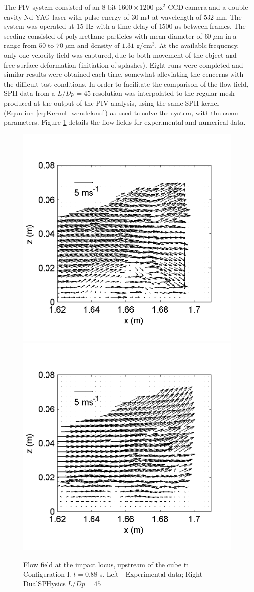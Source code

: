 The \ac{PIV} system consisted of an 8-bit $1600\times1200$ px$^2$ CCD camera and a double-cavity Nd-YAG laser with pulse energy of $30$ mJ at wavelength of $532$ mn. The system was operated at $15$ Hz with a time delay of $1500\; \mu$s between frames. The seeding consisted of polyurethane particles with mean diameter of $60\; \mu$m in a range from $50$ to $70\; \mu$m and density of $1.31$ g/cm$^3$. At the available frequency, only one velocity field was captured, due to both movement of the object and free-surface deformation (initiation of splashes). Eight runs were completed and similar results were obtained each time, somewhat alleviating the concerns with the difficult test conditions. In order to facilitate the comparison of the flow field, \ac{SPH} data from a $L/Dp=45$ resolution was interpolated to the regular mesh produced at the output of the \ac{PIV} analysis, using the same \ac{SPH} kernel (Equation \eqref{eq:Kernel_wendeland}) as used to solve the system, with the same parameters. Figure \ref{fig:PIV_1} details the flow fields for experimental and numerical data.
%
\begin{figure}[ht!]
	\centering 
	\includegraphics[width=0.45\linewidth]{Figures/5.Chapter/Fig_11a}
	\includegraphics[width=0.45\linewidth]{Figures/5.Chapter/Fig_11b}
	\caption{Flow field at the impact locus, upstream of the cube in Configuration I. $t=0.88$ s. Left - Experimental data; Right - DualSPHysics $L/Dp=45$}
	\label{fig:PIV_1} 
\end{figure}
%

